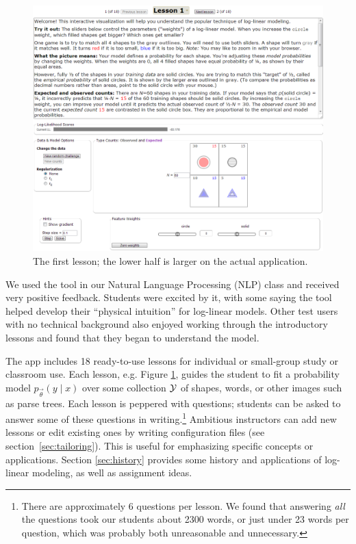 \documentclass[11pt,letterpaper]{article}
\newcommand{\Note}[1]{}
\newcommand{\NoteSigned}[3]{{\sethlcolor{#2}\Note{#1: #3}}}
\newcommand{\NoteFF}[1]{\NoteSigned{FF}{LightBlue}{#1}}
\newcommand{\NoteJE}[1]{\NoteSigned{JE}{LightGreen}{#1}}
\newcommand{\NumLessons}[0]{18}%
\begin{document}
\begin{figure}
\centering
\includegraphics[scale=.47]{images/lesson1-060713-intro-zoom-with18.PNG}
\caption{The first lesson; the lower half is larger on the actual
  application.}
\label{fig:lesson1}
\end{figure}

We used the tool in our Natural Language Processing (NLP) class and received
very positive feedback.  Students were excited by it, with some saying
the tool helped develop their ``physical intuition'' for log-linear
models.
Other test users with no 
technical background also enjoyed working
through the introductory lessons and found that they began to understand 
the model.

The app includes \NumLessons{} ready-to-use lessons for individual or
small-group study or classroom use.  Each lesson, e.g. Figure
\ref{fig:lesson1}, guides the student to fit a probability model $p_{\vec{\theta}}(y \mid
x)$ over some collection ${\cal Y}$ of shapes, words, or other images
such as parse trees.  Each lesson is peppered with questions; students
can be asked to answer some of these questions in
writing.\footnote{There are approximately 6 questions per lesson. We
  found that answering {\em all} the questions took our students about
  2300 words, or just under 23 words per question, which was probably
  both unreasonable and unnecessary.}  Ambitious instructors can add new
lessons or edit existing ones by writing configuration files (see
section~\ref{sec:tailoring}). This is useful for emphasizing specific
concepts or applications.
Section \ref{sec:history} provides some history and applications of log-linear
modeling, as well as assignment ideas.
\end{document}
